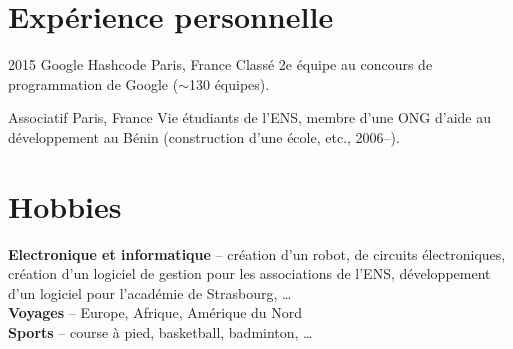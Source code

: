 \documentclass[]{friggeri-cv}
\begin{document}

\section{Expérience personnelle}

\begin{entrylist}
\entry
{2015}
{Google Hashcode}
{Paris, France}
{Classé 2e équipe au concours de programmation de Google ($\sim$130 équipes).}

\entry
{}
{Associatif}
{Paris, France}
{Vie étudiants de l'ENS, membre d’une ONG d’aide au développement au Bénin (construction d’une école, etc., 2006--).}

\end{entrylist}


\section{Hobbies}
\textbf{Electronique et informatique} -- création d’un robot, de circuits électroniques, création d’un logiciel de gestion pour les associations de l’ENS, développement d’un logiciel pour l’académie de Strasbourg, …\\
\textbf{Voyages} -- Europe, Afrique, Amérique du Nord\\
\textbf{Sports} -- course à pied, basketball, badminton, …
\end{document}
